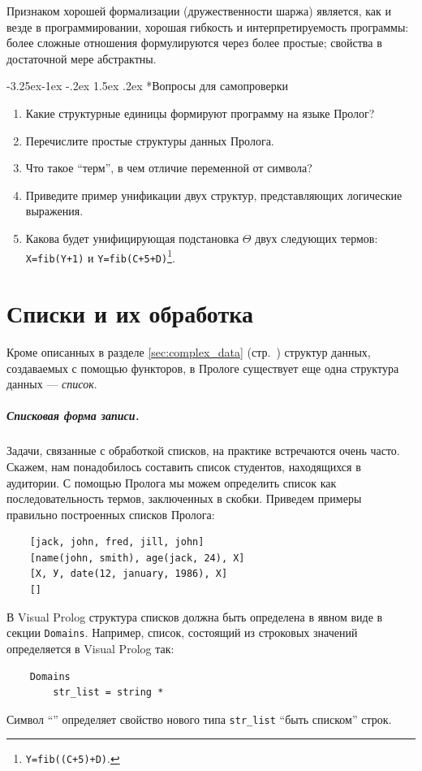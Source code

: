 \documentclass[12pt, openany, twoside]{book} %
\makeatletter
\renewcommand\subsubsection{\@startsection{subsubsection}{3}{\z@}%
                                     {-3.25ex\@plus -1ex \@minus -.2ex}%
                                     {1.5ex \@plus .2ex}%
                                     {\normalfont\normalsize\bfseries}}
\newenvironment{questions}{\subsubsection*{Вопросы для самопроверки}\begin{enumerate}}{\end{enumerate}}
\makeatother
\begin{document}
Признаком хорошей формализации (дружественности шаржа) является, как и везде в программировании, хорошая гибкость и интерпретируемость программы: более сложные отношения формулируются через более простые; свойства в достаточной мере абстрактны.

\begin{questions}
\item{} Какие структурные единицы формируют программу на языке Пролог?
\item{} Перечислите простые структуры данных Пролога.
\item{} Что такое ``терм'', в чем отличие переменной от символа?
\item{} Приведите пример унификации двух структур, представляющих логические выражения.
\item{} Какова будет унифицирующая подстановка $\Theta$ двух следующих термов: \texttt{X=fib(Y+1)} и \texttt{Y=fib(C+5+D)}\footnote{\texttt{Y=fib((C+5)+D)}.}.
\end{questions}

\chapter{Списки и их обработка}

Кроме описанных в разделе \ref{sec:complex_data} (стр.~\pageref{sec:complex_data}) структур данных, создаваемых с помощью функторов, в Прологе существует еще одна структура данных --- {\em список}.

\paragraph{Списковая форма записи.} Задачи, связанные с обработкой списков, на практике встречаются очень часто. Скажем, нам понадобилось составить список студентов, находящихся в аудитории. С помощью Пролога мы можем определить список как последовательность термов, заключенных в скобки. Приведем примеры правильно построенных списков Пролога:

{\tt\begin{verbatim}
    [jack, john, fred, jill, john]
    [name(john, smith), age(jack, 24), X]
    [Х, У, date(12, january, 1986), Х]
    []
\end{verbatim}}
\noindent В Visual Prolog структура списков должна быть определена в явном виде в секции {\tt Domains}. Например, список, состоящий из строковых значений определяется в Visual Prolog так:
{\tt\begin{verbatim}
    Domains
        str_list = string *
\end{verbatim}}
\noindent Символ ``{\tt *}'' определяет свойство нового типа {\tt str\_list} ``быть списком'' строк.
\end{document}
